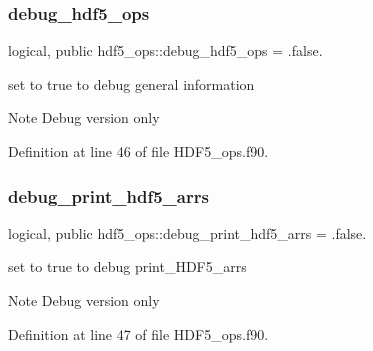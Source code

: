 \subsubsection{\texorpdfstring{debug\+\_\+hdf5\+\_\+ops}{debug\_hdf5\_ops}}
{\footnotesize\ttfamily logical, public hdf5\+\_\+ops\+::debug\+\_\+hdf5\+\_\+ops = .false.}



set to true to debug general information 

\begin{DoxyNote}{Note}
Debug version only 
\end{DoxyNote}


Definition at line 46 of file H\+D\+F5\+\_\+ops.\+f90.

\mbox{\label{namespacehdf5__ops_a00bbaa77652e040350c9726668cc22ac}} 
\subsubsection{\texorpdfstring{debug\+\_\+print\+\_\+hdf5\+\_\+arrs}{debug\_print\_hdf5\_arrs}}
{\footnotesize\ttfamily logical, public hdf5\+\_\+ops\+::debug\+\_\+print\+\_\+hdf5\+\_\+arrs = .false.}



set to true to debug print\+\_\+\+H\+D\+F5\+\_\+arrs 

\begin{DoxyNote}{Note}
Debug version only 
\end{DoxyNote}


Definition at line 47 of file H\+D\+F5\+\_\+ops.\+f90.

